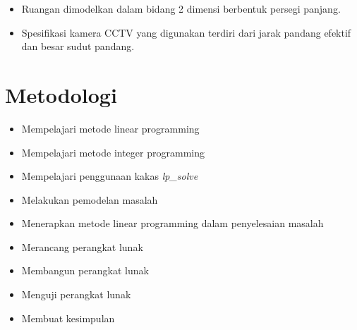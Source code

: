 \begin{itemize}
	\item Ruangan dimodelkan dalam bidang 2 dimensi berbentuk persegi panjang.
	\item Spesifikasi kamera CCTV yang digunakan terdiri dari jarak pandang efektif dan besar sudut pandang.
\end{itemize}

\section{Metodologi}
\label{sec:metlit}
\begin{itemize}
	\item Mempelajari metode linear programming
	\item Mempelajari metode integer programming
	\item Mempelajari penggunaan kakas \textit{lp{\_}solve}
	\item Melakukan pemodelan masalah
	\item Menerapkan metode linear programming dalam penyelesaian masalah
	\item Merancang perangkat lunak
	\item Membangun perangkat lunak
	\item Menguji perangkat lunak
	\item Membuat kesimpulan
\end{itemize}

